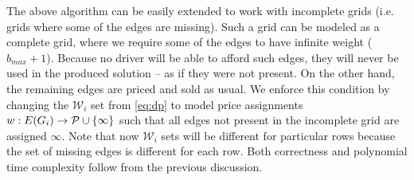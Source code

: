 The above algorithm can be easily extended to work with incomplete grids (i.e. grids where some of the edges are missing).
Such a grid can be modeled as a complete grid, where we require some of the edges to have infinite weight ($b_{max}+1$).
Because no driver will be able to afford such edges, they will never be used in the produced solution -- as if they were not present.
On the other hand, the remaining edges are priced and sold as usual.
We enforce this condition by changing the $\mathcal{W}_i$ set from \cref{eq:dp} to model
price assignments $w: E(G_i) \rightarrow \mathcal{P} \cup \left\{ \infty \right\}$ such that all edges not present in the incomplete grid are assigned $\infty$.
Note that now $\mathcal{W}_i$ sets will be different for particular rows because the set of missing edges is different for each row.
Both correctness and polynomial time complexity follow from the previous discussion.
